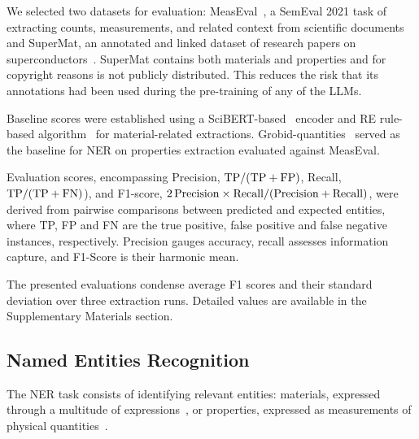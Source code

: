 We selected two datasets for evaluation: MeasEval~\cite{harper2021semeval2021}, a SemEval 2021 task of extracting counts, measurements, and related context from scientific documents and SuperMat, an annotated and linked dataset of research papers on superconductors~\cite{lfoppiano2021supermat}. 
SuperMat contains both materials and properties and for copyright reasons is not publicly distributed. 
This reduces the risk that its annotations had been used during the pre-training of any of the LLMs.

Baseline scores were established using a SciBERT-based~\cite{beltagy2020scibert} encoder and RE rule-based algorithm~\cite{lfoppiano2023automatic} for material-related extractions. Grobid-quantities~\cite{foppiano2019quantities} served as the baseline for NER on properties extraction evaluated against MeasEval.

Evaluation scores, encompassing Precision, $\rm TP/(TP+FP)$, Recall, $\rm TP/(TP+FN)$), and F1-score, $\rm 2\, Precision \times Recall / (Precision + Recall)$, were derived from pairwise comparisons between predicted and expected entities, where TP, FP and FN are the true positive, false positive and false negative instances, respectively. Precision gauges accuracy, recall assesses information capture, and F1-Score is their harmonic mean.

The presented evaluations condense average F1 scores and their standard deviation over three extraction runs. 
Detailed values are available in the Supplementary Materials section.

\subsection{Named Entities Recognition}
\label{sec:ner}
The NER task consists of identifying relevant entities: materials, expressed through a multitude of expressions~\cite{lfoppiano2021supermat}, or properties, expressed as measurements of physical quantities~\cite{foppiano2019quantities}. 

